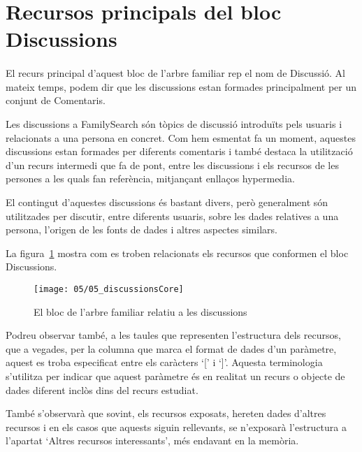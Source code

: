 \section{Recursos principals del bloc Discussions}

    \paragraph{}
    El recurs principal d'aquest bloc de l'arbre familiar rep el nom de Discussió. Al mateix temps, podem dir que les discussions estan formades principalment per un conjunt de Comentaris.

    Les discussions a FamilySearch són tòpics de discussió introduïts pels usuaris i relacionats a una persona en concret. Com hem esmentat fa un moment, aquestes discussions estan formades per diferents comentaris i també destaca la utilització d'un recurs intermedi que fa de pont, entre les discussions i els recursos de les persones a les quals fan re\-fe\-rèn\-cia, mitjançant enllaços hypermedia.

    El contingut d'aquestes discussions és bastant divers, però generalment són u\-ti\-lit\-za\-des per discutir, entre diferents usuaris, sobre les dades relatives a una persona, l'origen de les fonts de dades i altres aspectes similars.

    La figura~\ref{img:discussionsBloc} mostra com es troben relacionats els recursos que conformen el bloc Discussions.

    \begin{figure}[h]
        \texttt{[image: 05/05\_discussionsCore]}
        \centering
        \caption{El bloc de l'arbre familiar relatiu a les discussions}\label{img:discussionsBloc}
    \end{figure}

    Podreu observar també, a les taules que representen l'estructura dels recursos, que a vegades, per la columna que marca el format de dades d'un paràmetre, aquest es troba especificat entre els caràcters `[' i `]'. Aquesta terminologia s'utilitza per indicar que aquest paràmetre és en realitat un recurs o objecte de dades diferent inclòs dins del recurs estudiat.

    També s'observarà que sovint, els recursos exposats, hereten dades d'altres recursos i en els casos que aquests siguin rellevants, se n'exposarà l'estructura a l'apartat `Altres recursos interessants', més endavant en la memòria.

    
    
    
